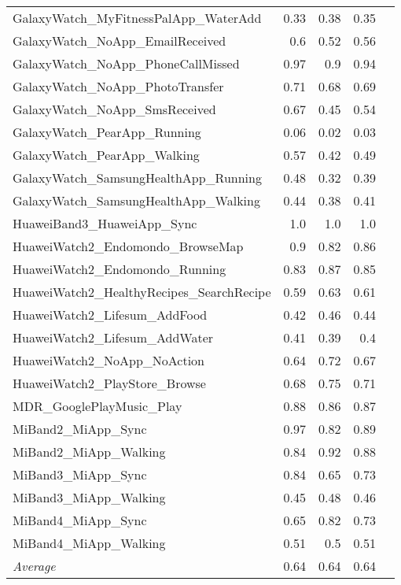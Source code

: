 \begin{tabular}{lrrrr}
    GalaxyWatch_MyFitnessPalApp_WaterAdd & 0.33 & 0.38 & 0.35 \\
    GalaxyWatch_NoApp_EmailReceived & 0.6 & 0.52 & 0.56 \\
    GalaxyWatch_NoApp_PhoneCallMissed & 0.97 & 0.9 & 0.94 \\
    GalaxyWatch_NoApp_PhotoTransfer & 0.71 & 0.68 & 0.69 \\
    GalaxyWatch_NoApp_SmsReceived & 0.67 & 0.45 & 0.54 \\
    GalaxyWatch_PearApp_Running & 0.06 & 0.02 & 0.03 \\
    GalaxyWatch_PearApp_Walking & 0.57 & 0.42 & 0.49 \\
    GalaxyWatch_SamsungHealthApp_Running & 0.48 & 0.32 & 0.39 \\
    GalaxyWatch_SamsungHealthApp_Walking & 0.44 & 0.38 & 0.41 \\
    HuaweiBand3_HuaweiApp_Sync & 1.0 & 1.0 & 1.0 \\
    HuaweiWatch2_Endomondo_BrowseMap & 0.9 & 0.82 & 0.86 \\
    HuaweiWatch2_Endomondo_Running & 0.83 & 0.87 & 0.85 \\
    HuaweiWatch2_HealthyRecipes_SearchRecipe & 0.59 & 0.63 & 0.61 \\
    HuaweiWatch2_Lifesum_AddFood & 0.42 & 0.46 & 0.44 \\
    HuaweiWatch2_Lifesum_AddWater & 0.41 & 0.39 & 0.4 \\
    HuaweiWatch2_NoApp_NoAction & 0.64 & 0.72 & 0.67 \\
    HuaweiWatch2_PlayStore_Browse & 0.68 & 0.75 & 0.71 \\
    MDR_GooglePlayMusic_Play & 0.88 & 0.86 & 0.87 \\
    MiBand2_MiApp_Sync & 0.97 & 0.82 & 0.89 \\
    MiBand2_MiApp_Walking & 0.84 & 0.92 & 0.88 \\
    MiBand3_MiApp_Sync & 0.84 & 0.65 & 0.73 \\
    MiBand3_MiApp_Walking & 0.45 & 0.48 & 0.46 \\
    MiBand4_MiApp_Sync & 0.65 & 0.82 & 0.73 \\
    MiBand4_MiApp_Walking & 0.51 & 0.5 & 0.51 \\
    \emph{Average} & 0.64 & 0.64 & 0.64 \\
\end{tabular}